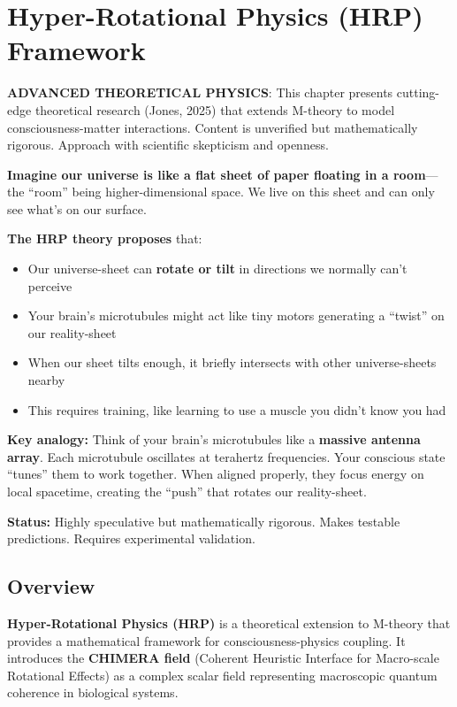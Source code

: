 \chapter{Hyper-Rotational Physics (HRP) Framework}
\label{ch:hrp}

\begin{warningbox}
\textbf{ADVANCED THEORETICAL PHYSICS}: This chapter presents cutting-edge theoretical research (Jones, 2025) that extends M-theory to model consciousness-matter interactions. Content is unverified but mathematically rigorous. Approach with scientific skepticism and openness.
\end{warningbox}

\begin{nontechnical}
\textbf{Imagine our universe is like a flat sheet of paper floating in a room}---the ``room'' being higher-dimensional space. We live on this sheet and can only see what's on our surface.

\textbf{The HRP theory proposes} that:
\begin{itemize}
\item Our universe-sheet can \textbf{rotate or tilt} in directions we normally can't perceive
\item Your brain's microtubules might act like tiny motors generating a ``twist'' on our reality-sheet
\item When our sheet tilts enough, it briefly intersects with other universe-sheets nearby
\item This requires training, like learning to use a muscle you didn't know you had
\end{itemize}

\textbf{Key analogy:} Think of your brain's microtubules like a \textbf{massive antenna array}. Each microtubule oscillates at terahertz frequencies. Your conscious state ``tunes'' them to work together. When aligned properly, they focus energy on local spacetime, creating the ``push'' that rotates our reality-sheet.

\textbf{Status:} Highly speculative but mathematically rigorous. Makes testable predictions. Requires experimental validation.
\end{nontechnical}

\section{Overview}
\label{sec:hrp-overview}

\textbf{Hyper-Rotational Physics (HRP)} is a theoretical extension to M-theory that provides a mathematical framework for consciousness-physics coupling. It introduces the \textbf{CHIMERA field} (Coherent Heuristic Interface for Macro-scale Rotational Effects) as a complex scalar field representing macroscopic quantum coherence in biological systems.

